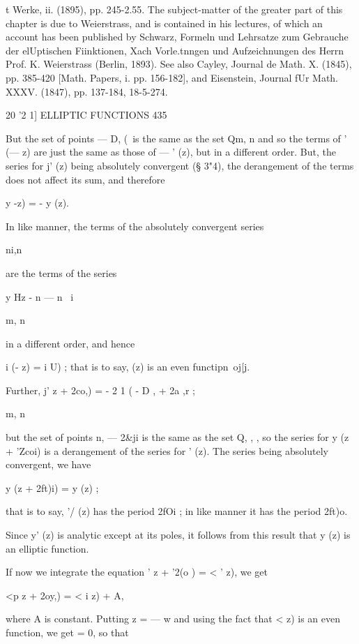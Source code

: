 {t Werke, ii. (1895), pp. 245-2.55. The subject-matter of the greater
part of this chapter is due to Weierstrass, and is contained in his
lectures, of which an account has been published by Schwarz, Formeln
und Lehrsatze zum Gebrauche der elUptischen Fiinktionen, Xach
Vorle.tnngen und Aufzeichnungen des Herrn Prof. K. Weierstrass
(Berlin, 1893). See also Cayley, Journal de Math. X. (1845), pp.
385-420 [Math. Papers, i. pp. 156-182], and Eisenstein, Journal fUr
Math. XXXV. (1847), pp. 137-184, 18-5-274.



20 '2 1] ELLIPTIC FUNCTIONS 435

But the set of points — D, (\ is the same as the set Qm, n and so the
terms of ' (— z) are just the same as those of — ' (z), but in a
different order. But, the series for j' (z) being absolutely
convergent (§ 3"4), the derangement of the terms does not affect its
sum, and therefore

 y -z) = - y (z).

In like manner, the terms of the absolutely convergent series

ni,n

are the terms of the series

y Hz - n — n~ i



m, n



in a different order, and hence

i (- z) = i U) ; that is to say, (z) is an even functipn\ oj[j.

Further, j' z + 2co,) = - 2 1 ( - D , + 2a ,r ;

m, n

but the set of points n, — 2\&ji is the same as the set Q, , , so the
series for y (z + 'Zcoi) is a derangement of the series for ' (z). The
series being absolutely convergent, we have

 y (z + 2ft)i) = y (z) ;

that is to say, '/ (z) has the period 2fOi ; in like manner it has the
period 2ft)o.

Since y' (z) is analytic except at its poles, it follows from this
result that y (z) is an elliptic function.

If now we integrate the equation ' z + '2(o ) = < ' z), we get

<p z + 2oy,) = < i z) + A,

where A is constant. Putting z = — w and using the fact that < z) is
an even function, we get = 0, so that

}
